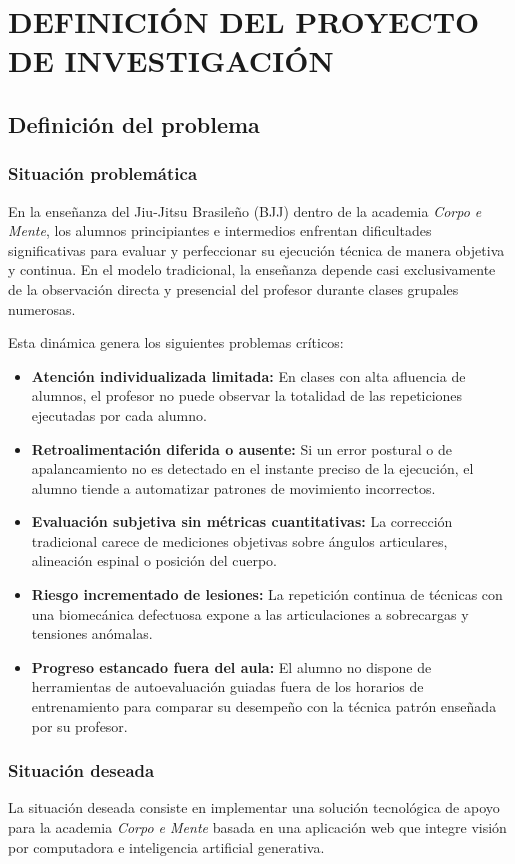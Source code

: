 \chapter{DEFINICIÓN DEL PROYECTO DE INVESTIGACIÓN}

\section{Definición del problema}

\subsection{Situación problemática}
En la enseñanza del Jiu-Jitsu Brasileño (BJJ) dentro de la academia \textit{Corpo e Mente}, los alumnos principiantes e intermedios enfrentan dificultades significativas para evaluar y perfeccionar su ejecución técnica de manera objetiva y continua. En el modelo tradicional, la enseñanza depende casi exclusivamente de la observación directa y presencial del profesor durante clases grupales numerosas. 

Esta dinámica genera los siguientes problemas críticos:
\begin{itemize}
    \item \textbf{Atención individualizada limitada:} En clases con alta afluencia de alumnos, el profesor no puede observar la totalidad de las repeticiones ejecutadas por cada alumno.
    \item \textbf{Retroalimentación diferida o ausente:} Si un error postural o de apalancamiento no es detectado en el instante preciso de la ejecución, el alumno tiende a automatizar patrones de movimiento incorrectos.
    \item \textbf{Evaluación subjetiva sin métricas cuantitativas:} La corrección tradicional carece de mediciones objetivas sobre ángulos articulares, alineación espinal o posición del cuerpo.
    \item \textbf{Riesgo incrementado de lesiones:} La repetición continua de técnicas con una biomecánica defectuosa expone a las articulaciones a sobrecargas y tensiones anómalas.
    \item \textbf{Progreso estancado fuera del aula:} El alumno no dispone de herramientas de autoevaluación guiadas fuera de los horarios de entrenamiento para comparar su desempeño con la técnica patrón enseñada por su profesor.
\end{itemize}

\subsection{Situación deseada}
La situación deseada consiste en implementar una solución tecnológica de apoyo para la academia \textit{Corpo e Mente} basada en una aplicación web que integre visión por computadora e inteligencia artificial generativa.

